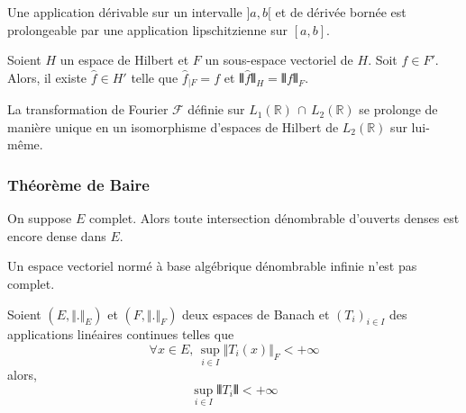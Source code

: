   \begin{example}
    Une application dérivable sur un intervalle $]a,b[$ et de dérivée bornée est prolongeable par une application lipschitzienne sur $[a,b]$.
  \end{example}


  \begin{application}
    Soient $H$ un espace de Hilbert et $F$ un sous-espace vectoriel de $H$. Soit $f \in F'$. Alors, il existe $\widehat{f} \in H'$ telle que $\widehat{f}_{|F} = f$ et $\VERT \widehat{f} \VERT_{H} = \VERT f \VERT_{F}$.
  \end{application}


  \begin{application}
    La transformation de Fourier $\mathcal{F}$ définie sur $L_1(\mathbb{R}) \, \cap \, L_2(\mathbb{R})$ se prolonge de manière unique en un isomorphisme d'espaces de Hilbert de $L_2(\mathbb{R})$ sur lui-même.
  \end{application}

  \subsubsection{Théorème de Baire}


  \begin{theorem}
    On suppose $E$ complet. Alors toute intersection dénombrable d'ouverts denses est encore dense dans $E$.
  \end{theorem}


  \begin{application}
    Un espace vectoriel normé à base algébrique dénombrable infinie n'est pas complet.
  \end{application}


  \begin{application}
    Soient $(E, \Vert . \Vert_E)$ et $(F, \Vert . \Vert_F)$ deux espaces de Banach et $(T_i)_{i \in I}$ des applications linéaires continues telles que
    \[ \forall x \in E, \, \sup_{i \in I} \Vert T_i(x) \Vert_F < +\infty \]
    alors,
    \[ \sup_{i \in I} \VERT T_i \VERT < +\infty \]
  \end{application}

